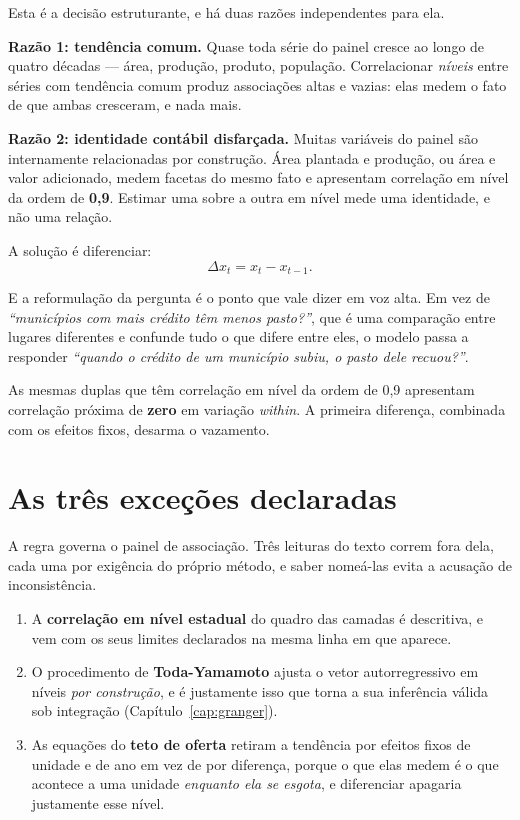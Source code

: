 Esta é a decisão estruturante, e há duas razões independentes para ela.

\textbf{Razão 1: tendência comum.} Quase toda série do painel cresce ao longo de
quatro décadas --- área, produção, produto, população. Correlacionar
\emph{níveis} entre séries com tendência comum produz associações altas e
vazias: elas medem o fato de que ambas cresceram, e nada mais.

\textbf{Razão 2: identidade contábil disfarçada.} Muitas variáveis do painel são
internamente relacionadas por construção. Área plantada e produção, ou área e
valor adicionado, medem facetas do mesmo fato e apresentam correlação em nível
da ordem de \textbf{0,9}. Estimar uma sobre a outra em nível mede uma
identidade, e não uma relação.

A solução é diferenciar:
\begin{equation}
\Delta x_t = x_t - x_{t-1}.
\end{equation}

E a reformulação da pergunta é o ponto que vale dizer em voz alta. Em vez de
\emph{``municípios com mais crédito têm menos pasto?''}, que é uma comparação
entre lugares diferentes e confunde tudo o que difere entre eles, o modelo
passa a responder \emph{``quando o crédito de um município subiu, o pasto dele
recuou?''}.

\begin{ancora}
As mesmas duplas que têm correlação em nível da ordem de 0,9 apresentam
correlação próxima de \textbf{zero} em variação \emph{within}. A primeira
diferença, combinada com os efeitos fixos, desarma o vazamento.
\end{ancora}

\section{As três exceções declaradas}

A regra governa o painel de associação. Três leituras do texto correm fora
dela, cada uma por exigência do próprio método, e saber nomeá-las evita a
acusação de inconsistência.

\begin{enumerate}
\item A \textbf{correlação em nível estadual} do quadro das camadas é
descritiva, e vem com os seus limites declarados na mesma linha em que aparece.
\item O procedimento de \textbf{Toda-Yamamoto} ajusta o vetor autorregressivo em
níveis \emph{por construção}, e é justamente isso que torna a sua inferência
válida sob integração (Capítulo~\ref{cap:granger}).
\item As equações do \textbf{teto de oferta} retiram a tendência por efeitos
fixos de unidade e de ano em vez de por diferença, porque o que elas medem é o
que acontece a uma unidade \emph{enquanto ela se esgota}, e diferenciar
apagaria justamente esse nível.
\end{enumerate}

